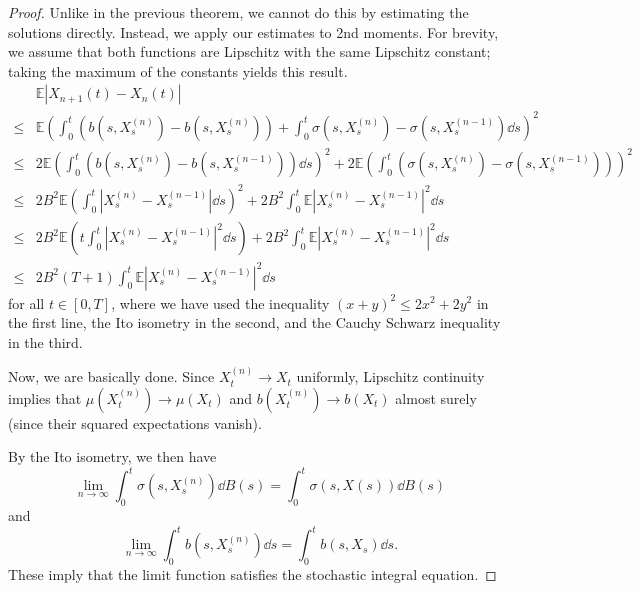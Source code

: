 \documentclass[prb,12pt]{revtex4-2}
\theoremstyle{definition}
\theoremstyle{definition}
\theoremstyle{definition}
\begin{document}
\begin{proof}
	Unlike in the previous theorem, we cannot do this by estimating the solutions directly. Instead, we apply our estimates to 2nd moments. For brevity, we assume that both functions are Lipschitz with the same Lipschitz constant; taking the maximum of the constants yields this result. 
	\begin{align*}
		&\mathbb{E}|X_{n+1}(t) - X_n(t)|\\
	\le &\mathbb{E}\left( \int_0^t (b(s, X^{(n)}_s) - b(s, X^{(n)}_s)) + \int_0^t \sigma(s, X^{(n)}_s) - \sigma(s, X^{(n-1)}_s)\dd{s}\right)^2\\
		\le & 2\mathbb{E}\left( \int_0^t (b(s, X^{(n)}_s) - b(s, X^{(n-1)}_s))\dd{s} \right)^2 + 2\mathbb{E}\left( \int_0^t (\sigma(s, X^{(n)}_s) - \sigma(s, X^{(n-1)}_s)) \right)^2\\
		\le& 2B^2 \mathbb{E}\left( \int_0^t |X^{(n)}_s - X^{(n-1)}_s|\dd{s} \right)^2 + 2B^2 \int_0^t \mathbb{E}|X^{(n)}_s - X^{(n-1)}_s|^2 \dd{s}\\
		\le& 2B^2 \mathbb{E}\left( t\int_0^t |X^{(n)}_s - X^{(n-1)}_s|^2\dd{s} \right)+2B^2 \int_0^t \mathbb{E}|X^{(n)}_s - X^{(n-1)}_s|^2\dd{s}\\
		\le& 2B^2(T+1)\int_0^t \mathbb{E}|X^{(n)}_s - X^{(n-1)}_s|^2\dd{s}
	\end{align*}
	for all $t\in [0,T]$, where we have used the inequality $(x+y)^2 \le 2x^2+2y^2$ in the first line, the Ito isometry in the second, and the Cauchy Schwarz inequality in the third.

	Now, we are basically done. Since $X^{(n)}_t \to X_t$ uniformly, Lipschitz continuity implies that $\mu(X^{(n)}_t) \to \mu(X_t)$ and $b(X^{(n)}_t)\to b(X_t)$ almost surely (since their squared expectations vanish). 

	By the Ito isometry, we then have
	\[
	\lim_{n \to \infty} \int_0^t \sigma(s, X^{(n)}_s)\dd{B(s)} = \int_0^t \sigma(s, X(s))\dd{B(s)}
	\]
	and
	\[
	\lim_{n \to \infty} \int_0^t b(s, X^{(n)}_s)\dd{s} = \int_0^t b(s, X_s)\dd{s}
	.\] 
	These imply that the limit function satisfies the stochastic integral equation.
\end{proof}
\end{document}
